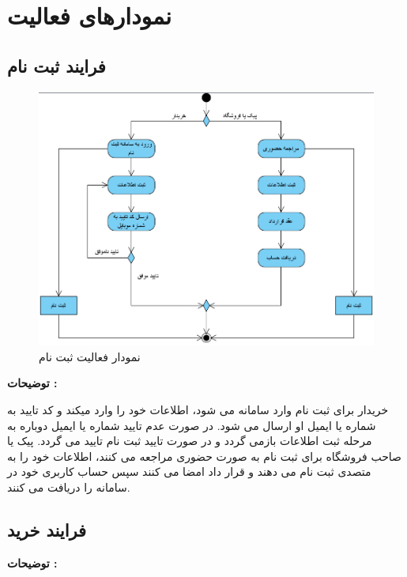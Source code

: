 \documentclass[12pt,a4paper]{article}
\begin{document}
\section{نمودارهای فعالیت} \label{section.activity}
	\subsection{فرایند ثبت نام} \label{section.activity.register}
		\begin{figure}[h!]
			\begin{center}
				\includegraphics[width=14cm]{images/Register Activity Diagram.png}
			\end{center}
			\caption{نمودار فعالیت ثبت نام}
		\end{figure}
	
	\textbf{توضیحات :} 
	
	
	خریدار برای ثبت نام وارد سامانه می شود، اطلاعات خود را وارد میکند و کد تایید به شماره یا ایمیل او ارسال می شود. در صورت عدم تایید شماره یا ایمیل دوباره به مرحله ثبت اطلاعات بازمی گردد و در صورت تایید ثبت نام تایید می گردد.	پیک یا صاحب فروشگاه برای ثبت نام به صورت حضوری مراجعه می کنند، اطلاعات خود را به متصدی ثبت نام می دهند و قرار داد امضا می کنند سپس حساب کاربری خود در سامانه را دریافت می کنند.
\pagebreak	
	\subsection{فرایند خرید} \label{section.activity.buy}
	\textbf{توضیحات :} 
	
\end{document}
